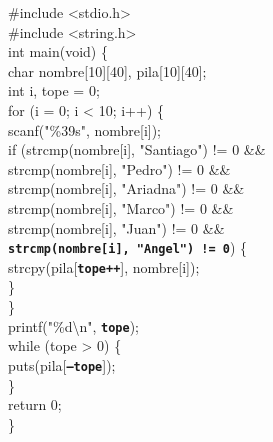 \documentclass[10pt, a4paper]{article}
\newcommand{\codigoResaltado}[1]{\colorbox{fondoresaltado}{\textbf{\color{verdecompletado}\texttt{#1}}}}
\begin{document}
\vspace{1.5mm}
\begin{tcolorbox}[colback=fondocodigo, colframe=azulborde, leftrule=2mm, arc=1mm, boxrule=0.5pt, top=1.5mm, bottom=1.5mm]
\small\ttfamily
\#include <stdio.h>\\
\#include <string.h>\\[1mm]
int main(void) \{\\
\hspace*{4mm}char nombre[10][40], pila[10][40];\\
\hspace*{4mm}int i, tope = 0;\\
\hspace*{4mm}for (i = 0; i < 10; i++) \{\\
\hspace*{8mm}scanf("\%39s", nombre[i]);\\
\hspace*{8mm}if (strcmp(nombre[i], "Santiago") != 0 \&\&\\
\hspace*{12mm}strcmp(nombre[i], "Pedro") != 0 \&\&\\
\hspace*{12mm}strcmp(nombre[i], "Ariadna") != 0 \&\&\\
\hspace*{12mm}strcmp(nombre[i], "Marco") != 0 \&\&\\
\hspace*{12mm}strcmp(nombre[i], "Juan") != 0 \&\&\\
\hspace*{12mm}\codigoResaltado{strcmp(nombre[i], "Angel") != 0}) \{\\
\hspace*{12mm}strcpy(pila[\codigoResaltado{tope++}], nombre[i]);\\
\hspace*{8mm}\}\\
\hspace*{4mm}\}\\
\hspace*{4mm}printf("\%d\textbackslash n", \codigoResaltado{tope});\\
\hspace*{4mm}while (tope > 0) \{\\
\hspace*{8mm}puts(pila[\codigoResaltado{--tope}]);\\
\hspace*{4mm}\}\\
\hspace*{4mm}return 0;\\
\}
\end{tcolorbox}
\end{document}
